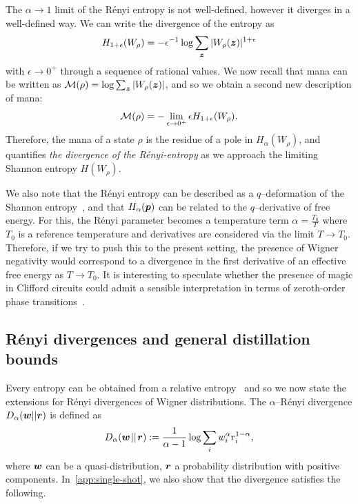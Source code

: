 \documentclass[pra,
aps,
twocolumn,
superscriptaddress,
groupedaddress,
nofootinbib,
reprint
]{revtex4-1}
\begin{document}
The $\alpha \rightarrow 1$ limit of the R\'{e}nyi entropy is not well-defined, however it diverges in a well-defined way. We can write the divergence of the entropy as 
\begin{equation}
	H_{1+\epsilon}(W_\rho) = -\epsilon^{-1} \log \sum_{\bm{z}} |W_\rho (\bm{z})|^{1+\epsilon}
\end{equation} 
with $\epsilon \rightarrow 0^+$ through a sequence of rational values. We now recall that mana can be written as ${\mathcal M}(\rho) = \log \sum_{\bm{z}} |W_\rho(\bm{z})|$, and so we obtain a second new description of mana:
\begin{equation}\label{eq:mana-divergence}
{\mathcal M}(\rho) = -\lim_{\epsilon \rightarrow 0^+} \epsilon H_{1+\epsilon}(W_\rho).
\end{equation}
Therefore, the mana of a state $\rho$ is the residue of a pole in $H_\alpha(W_\rho)$, and quantifies \emph{the divergence of the R\'{e}nyi-entropy} as we approach the limiting Shannon entropy $H(W_\rho)$. 

We also note that the R\'{e}nyi entropy can be described as a $q$--deformation of the Shannon entropy~\cite{baez2011renyi}, and that $H_\alpha(\boldsymbol{p})$ can be related to the $q$--derivative of free energy.  For this, the R\'{e}nyi parameter becomes a temperature term $\alpha = \frac{T_0}{T}$ where $T_0$ is a reference temperature and derivatives are considered via the limit $T \rightarrow T_0$. Therefore, if we try to push this to the present setting, the presence of Wigner negativity would correspond to a divergence in the first derivative of an effective free energy as $T \rightarrow T_0$. It is interesting to speculate whether the presence of magic in Clifford circuits could admit a sensible interpretation in terms of zeroth-order phase transitions~\cite{Aharonov_2000, Shiyu_2020, Ippoliti_2021}.

\subsection{R\'{e}nyi divergences and general distillation bounds}
Every entropy can be obtained from a relative entropy~\cite{Gour_2020} and so we now state the extensions for R\'{e}nyi divergences of Wigner distributions.
The $\alpha$--R\'{e}nyi divergence $D_\alpha(\boldsymbol{w}||\boldsymbol{r})$ is defined as
\begin{equation}
	D_\alpha(\boldsymbol{w} \hspace{1pt}||\hspace{1pt} \boldsymbol{r}) := \frac{1}{\alpha-1} \log \sum_i w_i^\alpha r_i^{1-\alpha},
\end{equation}
where $\boldsymbol{w}$ can be a quasi-distribution, $\boldsymbol{r}$ a probability distribution with positive components. In~\cref{app:single-shot}, we also show that the divergence satisfies the following.
\end{document}
